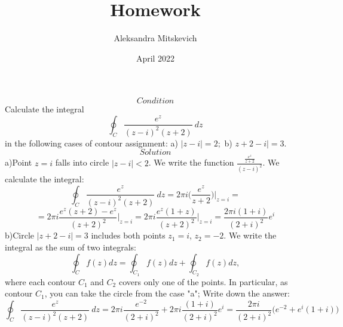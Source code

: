\documentclass{article}
\title{Homework }
\author{Aleksandra Mitskevich}
\date{April 2022}
\begin{document}
\maketitle

\[ Condition \]
 Calculate the integral \[ \oint_C \frac{e^z}{(z-i)^2(z+2)}\ dz\]
 in the following cases of contour assignment:
a) \( |z-i|=2;\)
b) \(z+2-i|=3.\)
\[ Solution\]
 a)Point \(z=i\) falls into circle \(|z-i|<2\). We write the function \(\frac{\frac{e^z}{z+2}}{(z-i)^2}\). We calculate the integral:
 \[ 
 \oint_C \frac{e^z}{(z-i)^2(z+2)}\ dz =2\pi i \Bigg( \frac{e^z}{z+2} \Bigg)\Bigg|_{z=i}=\]
 \[= 2\pi i \frac{e^z(z+2)-e^z}{(z+2)^2}\Bigg|_{z=i}=2\pi i \frac{e^z(1+z)}{(z+2)^2}\Bigg|_{z=i}=\frac{2\pi i(1+i)}{(2+i)^2}e^i\]
 b)Circle \(|z+2-i|=3\) includes both points \(z_1=i\), \(z_2=-2\). We write the integral as the sum of two integrals:
 \[\oint_C f(z)dz= \oint_{C_1} f(z)dz +  \oint_{C_2} f(z)dz,\]
where each contour \(C_1\) and \(C_2\) covers only one of the points. In particular, as contour \(C_1\), you can take the circle from the case "a"; Write down the answer:
\[ \oint_C \frac{e^z}{(z-i)^2(z+2)}\ dz=2\pi i\frac{e^{-2}}{(2+i)^2} + 2\pi i\frac{(1+i)}{(2+i)^2}e^i=\frac{2\pi i}{(2+i)^2}\Big( e^{-2} + e^i (1+i)  \Big)\]
\end{document}
